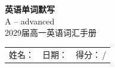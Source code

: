 \documentclass[11pt,a4paper]{article}
\begin{document}
\pagestyle{plain}

\begin{center}
{\LARGE\bfseries 英语单词默写}\\[0.3em]
{\large A -- advanced}\\[0.25em]
{\small 2029届高一英语词汇手册}
\end{center}

\vspace{0.5em}
\noindent\begin{tabular}{@{}p{}@{}p{}@{}p{}@{}}
姓名：\underline{\hspace{2.2cm}} & 日期：\underline{\hspace{2.2cm}} & 得分：\underline{\hspace{1.5cm}}\,/\enspace 50 \\
\end{tabular}

\vspace{0.6em}
\end{document}
